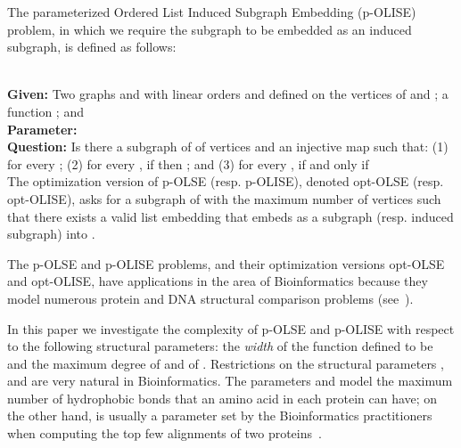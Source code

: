 \documentclass[11pt]{article}
\newcommand{\paramproblem}[4]{\noindent {\sc #1}
\\
{\bf Given:} #2\\
{\bf Parameter:} #3\\
{\bf Question:} #4}
\begin{document}
The parameterized {\sc Ordered List Induced Subgraph Embedding} (p-{\sc OLISE}) problem, in which we require the subgraph  to be embedded as an induced subgraph, is defined as follows:

\paramproblem{} {Two graphs  and  with linear orders  and  defined on the vertices of  and ; a function ; and }{}{Is there a subgraph  of  of  vertices and an injective map  such that: (1)  for every ; (2) for every , if  then ; and (3) for every ,  if and only if } \\

The optimization version of p-OLSE (resp. p-OLISE), denoted opt-OLSE (resp. opt-OLISE), asks for a subgraph  of  with the maximum number of vertices such that there exists a valid list embedding  that embeds  as a subgraph (resp. induced subgraph) into .

The p-OLSE and p-OLISE problems, and their optimization versions opt-OLSE and opt-OLISE, have applications in the area of Bioinformatics because they model numerous protein and DNA structural comparison problems (see~\cite{xiuzhen,evansphd,evans,xiuzhencai}).

In this paper we investigate the complexity of p-OLSE and p-OLISE with respect to the following structural parameters: the {\em width}  of the function  defined to be  and the maximum degree  of  and  of . Restrictions on the structural parameters ,  and  are very natural in Bioinformatics. The parameters  and  model the maximum number of hydrophobic bonds that an amino acid in each protein can have; on the other hand,  is usually a parameter set by the Bioinformatics practitioners when computing the top few alignments of two proteins~\cite{xiuzhencai}.
\end{document}
